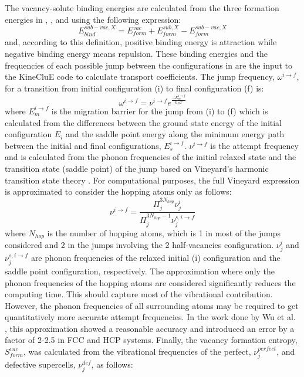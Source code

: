 \documentclass[preprint,12pt]{elsarticle}
\begin{document}
The vacancy-solute binding energies are calculated from the three formation energies in , , and  using the following expression:
\begin{equation}
\label{eq_Eb}
    E_{bind}^{sub-vac,X} = E_{form}^{vac} + E_{form}^{sub,X} - E_{form}^{sub-vac,X}
\end{equation}
and, according to this definition, positive binding energy is attraction while negative binding energy means repulsion. These binding energies and the frequencies of each possible jump between the configurations in  are the input to the KineCluE code to calculate transport coefficients. The jump frequency, $\omega^{i\rightarrow f}$, for a transition from initial configuration (i) to final configuration (f) is: \begin{equation}
    \omega^{i\rightarrow f} = \nu^{i\rightarrow f} e^{\frac{-E_m^{i\rightarrow f}}{k_B T}}
\end{equation}
where $E_m^{i\rightarrow f}$ is the migration barrier for the jump from (i) to (f) which is calculated from the differences between the ground state energy of the initial configuration $E_i$ and the saddle point energy along the minimum energy path between the initial and final configurations, $E_s^{i\rightarrow f}$. $\nu^{i\rightarrow f}$ is the attempt frequency and is calculated from the phonon frequencies of the initial relaxed state and the transition state (saddle point) of the jump based on Vineyard's harmonic transition state theory \cite{vineyard_frequency_1957}. For computational purposes, the full Vineyard expression is approximated to consider the hopping atoms only as follows:
\begin{equation}
    \nu^{i\rightarrow f} = \frac{\Pi^{3N_{hop}}_j  \nu^{i}_j}{\Pi^{3N_{hop}-1}_j  \nu^{s,i\rightarrow f}_j}
\end{equation}
where $N_{hop}$ is the number of hopping atoms, which is 1 in most of the jumps considered and 2 in the jumps involving the 2 half-vacancies configuration. $\nu^{i}_j$ and $\nu^{s,i\rightarrow f}_j$ are phonon frequencies of the relaxed initial (i) configuration and the saddle point configuration, respectively. The approximation where only the phonon frequencies of the hopping atoms are considered significantly reduces the computing time. This should capture most of the vibrational contribution. However, the phonon frequencies of all surrounding atoms may be required to get quantitatively more accurate attempt frequencies. In the work done by Wu et al. \cite{wu_high-throughput_2016}, this approximation showed a reasonable accuracy and introduced an error by a factor of 2-2.5 in FCC and HCP systems. Finally, the vacancy formation entropy, $S_{form}^{vac}$, was calculated from the vibrational frequencies of the perfect, $\nu_j^{perfect}$, and defective supercells, $\nu_j^{def}$, as follows:
\end{document}
